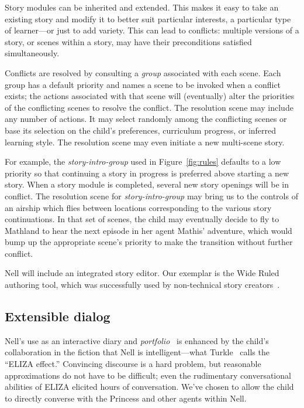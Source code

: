 \documentclass{sig-alternate}
\begin{document}
Story modules can be inherited and extended.
This makes it easy to take an existing story and modify it to
better suit particular interests, a particular type of learner---or
just to add variety.  This can lead to conflicts: multiple versions of
a story, or scenes within a story, may have their
preconditions satisfied simultaneously.

Conflicts are resolved by consulting a \textit{group} associated with
each scene.  Each group has a default priority and names a scene to be
invoked when a conflict exists; the actions associated with that scene
will (eventually) alter the priorities of the conflicting scenes to
resolve the conflict.  The resolution scene may include any number of
actions.  It may select randomly among the conflicting scenes or base
its selection on the
child's preferences, curriculum progress, or inferred learning style.
The resolution scene may even initiate a new multi-scene story.

For example, the \textit{story-intro-group}
used in Figure~\ref{fig:rules} defaults to a low priority so that
continuing a story in progress is preferred above starting a new story.
When a story module is completed, several new story openings will be in
conflict.  The resolution scene for \textit{story-intro-group} may bring us
to the controls of an airship which flies between locations
corresponding to the various story continuations.  In that set of
scenes, the child may eventually decide to fly to Mathland to hear the
next episode in her agent Mathis' adventure, which would bump up the
appropriate scene's priority to make the transition
without further conflict.

Nell will include an integrated story editor.  Our exemplar is
the Wide Ruled authoring tool, which was successfully used by
non-technical story creators~\cite{skorupski:2009}.


\subsection{Extensible dialog}
Nell's use as an interactive diary and
\textit{portfolio}~\cite{stefanakis:portfolios} is enhanced by the child's
collaboration in the fiction that Nell is intelligent---what
Turkle~\cite{turkle:alone} calls the ``ELIZA effect.''
Convincing discourse is a hard problem, but
reasonable approximations do not have to be difficult; even
the rudimentary conversational abilities of ELIZA elicited hours of
conversation.%
We've chosen to allow the child to directly converse with the
Princess and other agents within Nell.
\end{document}
